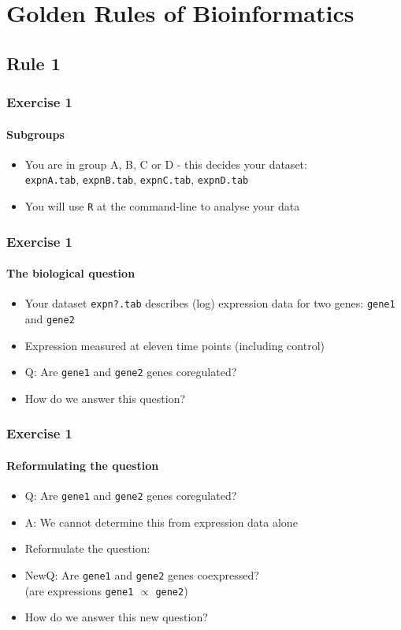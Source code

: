 \documentclass[table]{beamer}
\begin{document}
  \section{Golden Rules of Bioinformatics}
  
  \subsection{Rule 1}
  \begin{frame}
    \frametitle{Exercise 1}
    \framesubtitle{Subgroups}
    \begin{itemize}
      \item You are in group A, B, C or D - this decides your dataset: \\
      \texttt{expnA.tab}, \texttt{expnB.tab}, \texttt{expnC.tab}, \texttt{expnD.tab}
      \item You will use \texttt{R} at the command-line to analyse your data
    \end{itemize}
  \end{frame}
  
  \begin{frame}
    \frametitle{Exercise 1}
    \framesubtitle{The biological question}
    \begin{itemize}
      \item Your dataset \texttt{expn?.tab} describes (log) expression data for two genes: \texttt{gene1} and \texttt{gene2}
      \item Expression measured at eleven time points (including control)
      \item Q: Are \texttt{gene1} and \texttt{gene2} genes coregulated?
      \item How do we answer this question?
    \end{itemize}
  \end{frame}  

  \begin{frame}
    \frametitle{Exercise 1}
    \framesubtitle{Reformulating the question}
    \begin{itemize}
      \item<1-> Q: Are \texttt{gene1} and \texttt{gene2} genes coregulated?
      \item<1-> A: We cannot determine this from expression data alone
      \item<2-> Reformulate the question:
      \item<2-> NewQ: Are \texttt{gene1} and \texttt{gene2} genes coexpressed? \\
            (are expressions \texttt{gene1} $\propto$ \texttt{gene2})
      \item<2-> How do we answer this new question?
    \end{itemize}
  \end{frame}
\end{document}

